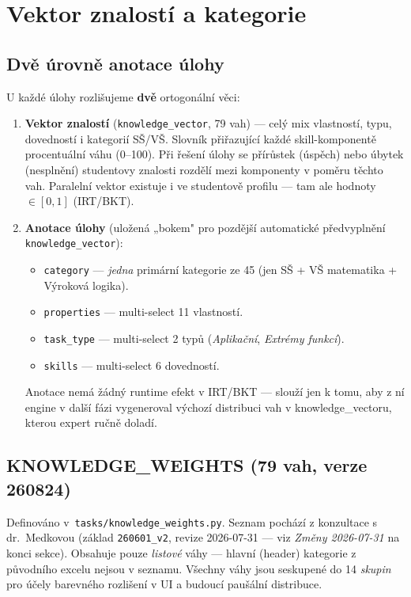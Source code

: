 \documentclass[11pt,a4paper]{article}
\begin{document}
\section{Vektor znalostí a kategorie}

\subsection{Dvě úrovně anotace úlohy}

U každé úlohy rozlišujeme \textbf{dvě} ortogonální věci:

\begin{enumerate}
  \item \textbf{Vektor znalostí} (\texttt{knowledge\_vector}, 79 vah) --- celý mix vlastností, typu, dovedností i kategorií SŠ/VŠ. Slovník přiřazující každé skill-komponentě procentuální váhu (0--100). Při řešení úlohy se přírůstek (úspěch) nebo úbytek (nesplnění) studentovy znalosti rozdělí mezi komponenty v poměru těchto vah. Paralelní vektor existuje i ve studentově profilu --- tam ale hodnoty $\in [0, 1]$ (IRT/BKT).
  \item \textbf{Anotace úlohy} (uložená „bokem" pro pozdější automatické předvyplnění \texttt{knowledge\_vector}):
  \begin{itemize}
    \item \texttt{category} --- \emph{jedna} primární kategorie ze 45 (jen SŠ + VŠ matematika + Výroková logika).
    \item \texttt{properties} --- multi-select 11 vlastností.
    \item \texttt{task\_type} --- multi-select 2 typů (\emph{Aplikační}, \emph{Extrémy funkcí}).
    \item \texttt{skills} --- multi-select 6 dovedností.
  \end{itemize}
  Anotace nemá žádný runtime efekt v IRT/BKT --- slouží jen k tomu, aby z ní engine v další fázi vygeneroval výchozí distribuci vah v knowledge\_vectoru, kterou expert ručně doladí.
\end{enumerate}

\subsection{KNOWLEDGE\_WEIGHTS (79 vah, verze 260824)}

Definováno v~\texttt{tasks/knowledge\_weights.py}. Seznam pochází z konzultace s dr.~Medkovou (základ \texttt{260601\_v2}, revize 2026-07-31 --- viz \emph{Změny 2026-07-31} na konci sekce). Obsahuje pouze \emph{listové} váhy --- hlavní (header) kategorie z původního excelu nejsou v seznamu. Všechny váhy jsou seskupené do 14 \emph{skupin} pro účely barevného rozlišení v UI a budoucí paušální distribuce.
\end{document}
